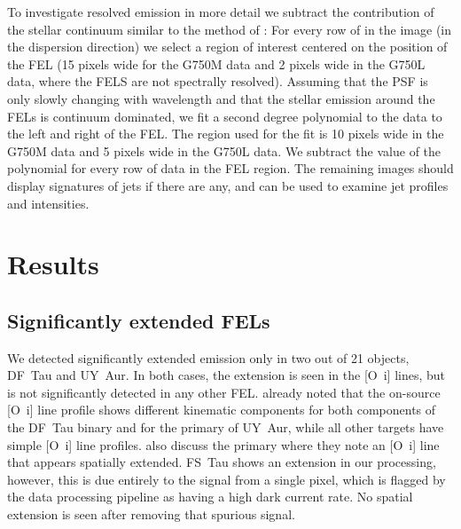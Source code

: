 \documentclass[twocolumn,trackchanges]{aastex62}
\begin{document}
To investigate resolved emission in more detail we subtract the contribution of
the stellar continuum similar to the method of \citet{2013A&A...550L...1S}: For
every row of in the image (in the dispersion direction) we select a region of
interest centered on the position of the FEL (15 pixels wide for the G750M data
and 2 pixels wide in the G750L data, where the FELS are not spectrally
resolved). Assuming that the PSF is only slowly changing with wavelength and
that the stellar emission around the FELs is continuum dominated, we fit a
second degree polynomial to the data to the left and right of the FEL. The
region used for the fit is 10 pixels wide in the G750M data and 5 pixels wide
in the G750L data. We subtract the value of the polynomial for every row of
data in the FEL region. The remaining images should display signatures of jets
if there are any, and can be used to examine jet profiles and intensities. 

\section{Results}
\label{sect:results}

\subsection{Significantly extended FELs}
We detected significantly extended emission only in two out of 21 objects,
DF~Tau and UY~Aur. In both cases, the extension is seen in the [O~{\sc i}]
lines, but is not significantly detected in any other
FEL. \citet{2003ApJ...583..334H} already noted that the on-source [O~{\sc i}]
line profile shows different kinematic components for both components of the
DF~Tau binary and for the primary of UY~Aur, while all other targets have
simple [O~{\sc i}] line profiles. \citet{2003ApJ...583..334H} also discuss the
 primary where they note an [O~{\sc i}] line that appears spatially
extended. FS~Tau shows an extension in our processing, however, this is due
entirely to the signal from a single pixel, which is flagged by the data
processing pipeline as having a high dark current rate. No spatial extension is seen after removing that spurious signal.

\end{document}
